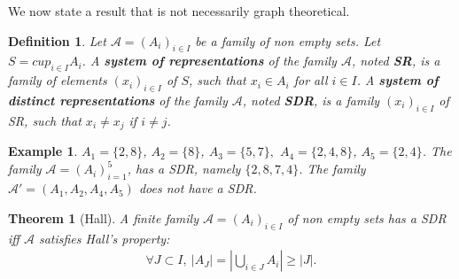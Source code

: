 \documentclass[12pt,a4paper]{article}
\newtheorem{thm}{Theorem}[section]
\newtheorem{defn}{Definition}[section]
\newtheorem{exmp}{Example}[section]
\theoremstyle{definition}
\begin{document}
\newpage
We now state a result that is not necessarily graph theoretical. 
\begin{defn} Let $\mathcal{A}= (A_i)_{i \in I}$ be a family of non empty sets. Let $S= cup_{i \in I} A_i$. A \textbf{system of representations} of the family $\mathcal{A}$, noted \textbf{SR}, is a family of elements $(x_i)_{i \in I}$ of $S$,  such that $x_i \in A_i$ for all $i \in I$. A \textbf{system of distinct representations} of the family $\mathcal{A}$, noted \textbf{SDR}, is a family $(x_i)_{i \in I}$ of SR, such that $x_i \neq x_j$ if $i \neq j$. 
\end{defn}
\begin{exmp} $A_1=\{2,8\}$, $A_2=\{8\}$, $A_3=\{5,7\},$ $A_4=\{2,4,8\}$, $A_5=\{2,4\}$. The family $\mathcal{A}= (A_i)_{i=1}^5$, has a SDR, namely $\{2,8,7,4\}$. The family $\mathcal{A}'=(A_1,A_2,A_4,A_5)$ does not have a SDR.
\end{exmp}
\begin{thm}[Hall] A finite family $\mathcal{A}=(A_i)_{i \in I}$ of non empty sets has a SDR iff $\mathcal{A}$ satisfies Hall's property: 
\begin{align*}
\forall J \subset I, \ |A_J| = \left| \bigcup_{i \in J} A_i \right| \geq |J|.
\end{align*}
\end{thm}
\end{document}
